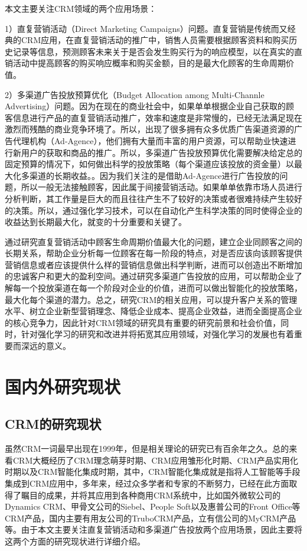 本文主要关注CRM领域的两个应用场景：

1）直复营销活动（Direct Marketing Campaigns）问题。直复营销是传统而又经典的CRM应用，在直复营销活动的推广中，销售人员需要根据顾客资料和购买历史记录等信息，预测顾客未来关于是否会发生购买行为的响应模型，以在真实的直销活动中提高顾客的购买响应概率和购买金额，目的是最大化顾客的生命周期价值。

2）多渠道广告投放预算优化（Budget Allocation among Multi-Channle Advertising）问题。因为在现在的商业社会中，如果单单根据企业自己获取的顾客信息进行产品的直复营销活动推广，效率和速度是非常慢的，已经无法满足现在激烈而残酷的商业竞争环境了。所以，出现了很多拥有众多优质广告渠道资源的广告代理机构（Ad-Agence），他们拥有大量而丰富的用户资源，可以帮助业快速进行新用户的获取和商品的推广。所以，多渠道广告投放预算优化需要解决给定总的固定预算的情况下，如何做出科学的投放策略（每个渠道应该投放的资金量）以最大化多渠道的长期收益。\citep{zhang2017multi}。因为我们关注的是借助Ad-Agence进行广告投放的问题，所以一般无法接触顾客，因此属于间接营销活动。如果单单依靠市场人员进行分析判断，其工作量是巨大的而且往往产生不了较好的决策或者很难持续产生较好的决策。所以，通过强化学习技术，可以在自动化产生科学决策的同时使得企业的收益达到长期最大化，就变的十分重要和关键了。

通过研究直复营销活动中顾客生命周期价值最大化的问题，建立企业同顾客之间的长期关系，帮助企业分析每一位顾客在每一阶段的特点，对是否应该向该顾客提供营销信息或者应该提供什么样的营销信息做出科学判断，进而可以创造出不断增加的忠诚客户和更大的盈利空间。通过研究多渠道广告投放的应用，可以帮助企业了解每一个投放渠道在每一个阶段对企业的价值，进而可以做出智能化的投放策略，最大化每个渠道的潜力。总之，研究CRM的相关应用，可以提升客户关系的管理水平、树立企业新型营销理念、降低企业成本、提高企业效益，进而全面提高企业的核心竞争力，因此针对CRM领域的研究具有重要的研究前景和社会价值，同时，针对强化学习的研究和改进并将拓宽其应用领域，对强化学习的发展也有着重要而深远的意义。

\section{国内外研究现状}

\subsection{CRM的研究现状}
虽然CRM一词最早出现在1999年，但是相关理论的研究已有百余年之久。总的来看CRM大概经历了CRM理念萌芽时期、CRM应用雏形化时期、CRM产品实用化时期以及CRM智能化集成时期\citep{王广宇2013客户关系管理}，其中，CRM智能化集成就是指将人工智能等手段集成到CRM应用中，多年来，经过众多学者和专家的不断努力，已经在此方面取得了瞩目的成果\citep{bahari2015efficient,farquad2014churn,linoff2011data,chiang2018applying,ballings2015crm}，并将其应用到各种商用CRM系统中，比如国外微软公司的Dynamics CRM、甲骨文公司的Siebel、People Soft以及惠普公司的Front Office等CRM产品，国内主要有用友公司的TruboCRM产品，立有信公司的MyCRM产品等。由于本文主要关注直复营销活动和多渠道广告投放两个应用场景，因此主要将这两个方面的研究现状进行详细介绍。

